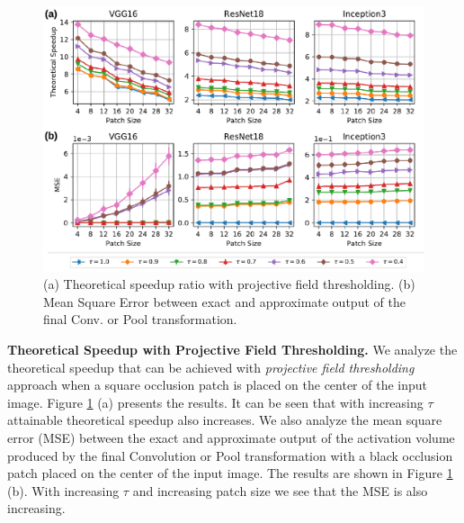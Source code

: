 \begin{figure}[t]
\includegraphics[width=\columnwidth]{images/proj_thresholding}
\caption{(a) Theoretical speedup ratio with projective field thresholding. (b) Mean Square Error between exact and approximate output of the final Conv. or Pool transformation.}
\label{fig:proj_thresholding}
\end{figure}

\vspace{2mm}
\noindent \textbf{Theoretical Speedup with Projective Field Thresholding.}
We analyze the theoretical speedup that can be achieved with \textit{projective field thresholding} approach when a square occlusion patch is placed on the center of the input image.
Figure \ref{fig:proj_thresholding} (a) presents the results.
It can be seen that with increasing $\tau$ attainable theoretical speedup also increases.
We also analyze the mean square error (MSE) between the exact and approximate output of the activation volume produced by the final Convolution or Pool transformation with a black occlusion patch placed on the center of the input image.
The results are shown in Figure \ref{fig:proj_thresholding} (b).
With increasing $\tau$ and increasing patch size we see that the MSE is also increasing.



